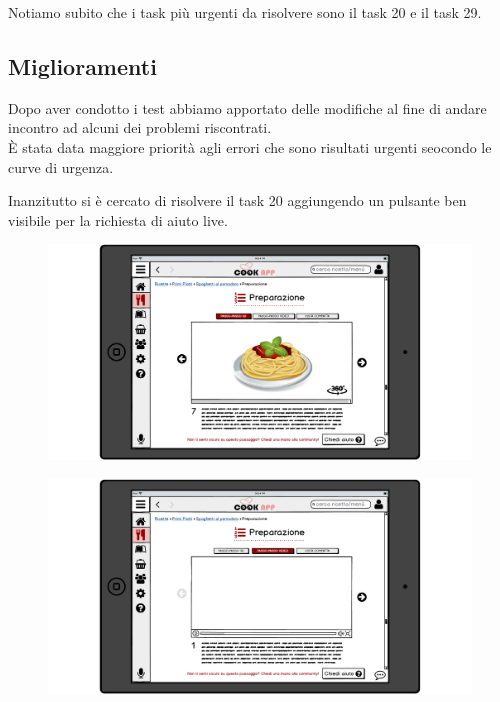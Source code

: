 Notiamo subito che i task più urgenti da risolvere sono il task 20 e il
task 29.

\subsection{Miglioramenti}
Dopo aver condotto i test abbiamo apportato delle modifiche al fine di
andare incontro ad alcuni dei problemi riscontrati.\\
È stata data maggiore priorità agli errori che sono risultati urgenti
seocondo le curve di urgenza.

Inanzitutto si è cercato di risolvere il task 20 aggiungendo un pulsante
ben visibile per la richiesta di aiuto live.\\


\begin{figure}[H]
	\includegraphics[width=\linewidth]{img/mockup/Ricetta3-fixed.png}
\end{figure}

\begin{figure}[H]
	\includegraphics[width=\linewidth]{img/mockup/Ricetta4-fixed.png}
\end{figure}

